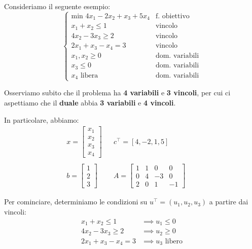 \begin{exa}
    Consideriamo il seguente esempio:
    \[
        \begin{cases}
            \text{min } 4x_{1} - 2x_{2} + x_{3} + 5x_{4} & \text{f. obiettivo} \\ 
            x_{1} + x_{2} \le 1 & \text{vincolo} \\ 
            4x_{2} - 3x_{3} \ge 2 & \text{vincolo} \\ 
            2x_{1} + x_{3} - x_{4} = 3 & \text{vincolo} \\ 
            x_{1},x_{2} \ge 0 & \text{dom. variabili} \\ 
            x_{3} \le 0 & \text{dom. variabili} \\
            x_{4} \text{ libera} & \text{dom. variabili}
        \end{cases}
    \] 
\end{exa}

Osserviamo subito che il problema ha \textbf{4 variabili} e \textbf{3 vincoli}, per cui
ci aspettiamo che il \textbf{duale} abbia \textbf{3 variabili} e \textbf{4 vincoli}.

In particolare, abbiamo:
\[
    \begin{aligned}
        x = \begin{bmatrix} x_{1} \\ x_{2} \\ x_{3} \\ x_{4} \end{bmatrix} & &
        c^\top = [4,-2,1,5] & & \\ \\
        b = \begin{bmatrix} 1 \\ 2 \\ 3 \end{bmatrix} & &
        A = \begin{bmatrix} 1 & 1 & 0 & 0 \\ 0 & 4 & -3 & 0 \\ 2 & 0 & 1 & -1 \end{bmatrix} 
    \end{aligned}
\]

Per cominciare, determiniamo le condizioni su $u^\top = (u_{1},u_{2},u_{3})$ a 
partire dai vincoli:
\[
    \begin{aligned}
        x_{1} + x_{2} \le 1 &\implies u_{1} \le 0 \\ 
        4x_{2} - 3x_{3} \ge  2 &\implies u_{2} \ge 0 \\
        2x_{1} + x_{3} - x_{4} = 3 &\implies u_{3} \text{ libero}
    \end{aligned}
\]


